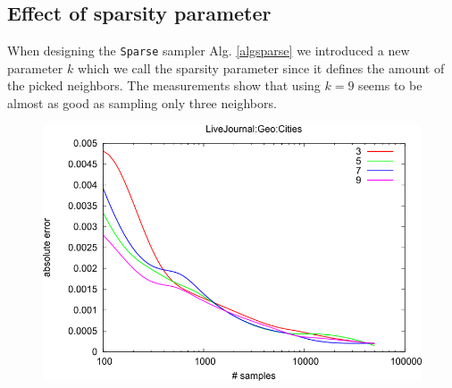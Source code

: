 \subsection{Effect of sparsity parameter}
When designing the \texttt{Sparse} sampler Alg. \ref{algsparse} we introduced a new parameter $k$ which we call the sparsity parameter since it defines the amount of the picked neighbors.
The measurements show that using $k=9$ seems to be almost as good as sampling only three neighbors.
\begin{figure}[!ht]
  \begin{center}
    \includegraphics[width=0.5\linewidth]{fig7b}
  \end{center}
\end{figure}
